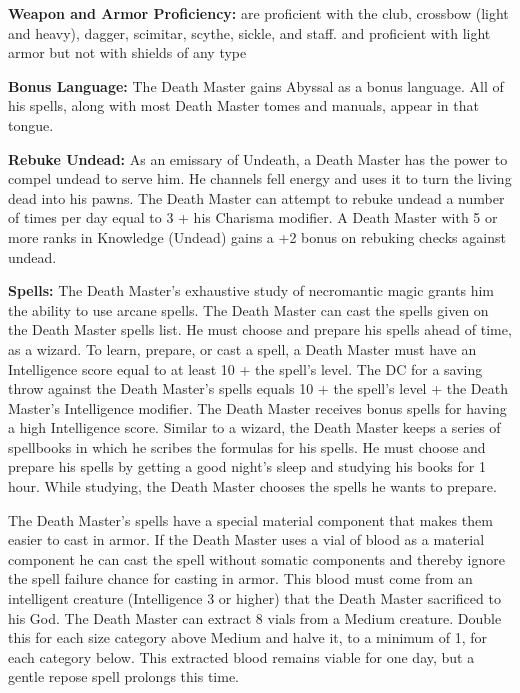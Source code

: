 \classfeatures

\textbf{Weapon and Armor Proficiency:} \currentclassname{} are proficient with the club, crossbow (light and heavy), dagger, scimitar, scythe, sickle, and staff. and proficient with light armor but not with shields of any type

\textbf{Bonus Language:} The Death Master gains Abyssal as a bonus language. All of his spells, along with most Death Master tomes and manuals, appear in that tongue.

\textbf{Rebuke Undead:} As an emissary of Undeath, a Death Master has the power to compel undead to serve him. He channels fell energy and uses it to turn the living dead into his pawns. The Death Master can attempt to rebuke undead a number of times per day equal to 3 + his Charisma modifier. A Death Master with 5 or more ranks in Knowledge (Undead) gains a +2 bonus on rebuking checks against undead.

\textbf{Spells:} The Death Master's exhaustive study of necromantic magic grants him the ability to use arcane spells. The Death Master can cast the spells given on the Death Master spells list. He must choose and prepare his spells ahead of time, as a wizard. To learn, prepare, or cast a spell, a Death Master must have an Intelligence score equal to at least 10 + the spell's level. The DC for a saving throw against the Death Master's spells equals 10 + the spell's level + the Death Master's Intelligence modifier. The Death Master receives bonus spells for having a high Intelligence score. Similar to a wizard, the Death Master keeps a series of spellbooks in which he scribes the formulas for his spells. He must choose and prepare his spells by getting a good night's sleep and studying his books for 1 hour. While studying, the Death Master chooses the spells he wants to prepare.

The Death Master's spells have a special material component that makes them easier to cast in armor. If the Death Master uses a vial of blood as a material component he can cast the spell without somatic components and thereby ignore the spell failure chance for casting in armor. This blood must come from an intelligent creature (Intelligence 3 or higher) that the Death Master sacrificed to his God. The Death Master can extract 8 vials from a Medium creature. Double this for each size category above Medium and halve it, to a minimum of 1, for each category below. This extracted blood remains viable for one day, but a gentle repose spell prolongs this time.

